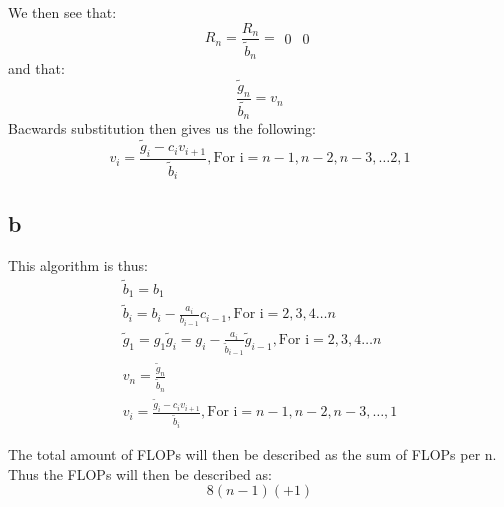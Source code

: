 \documentclass[english,notitlepage]{revtex4-1}  %
\begin{document}
        We then see that:
        \begin{equation*}
            R_n = \frac{R_n}{\tilde{b}_n} = 
            \begin{matrix}
            0 & 0 %
            \end{matrix}
        \end{equation*}
        and that:
        \begin{equation*}
            \frac{\tilde{g}_n}{\tilde{b_n}} = v_n
        \end{equation*}
            Bacwards substitution then gives us the following: 
        \begin{equation*}
            v_i = \frac{\tilde{g}_i - c_i v_{i+1}}{\tilde{b}_i}, \text{For i}  = n-1, n-2, n-3,  \dots 2, 1
        \end{equation*}
    \subsection*{b}
        \label{sec:6b}
        This algorithm is thus: 
        \begin{align*}
            \tilde{b}_1 
        =   b_1\\
            \tilde{b}_i 
        =   b_i - \frac{a_i}{b_{i-1}}c_{i-1}, \text{For i} = 2,3,4\dots n\\
            \tilde{g}_1 
        =   g_1
            \tilde{g}_i 
        =   g_i - \frac{a_i}{\tilde{b}_{i-1}}\tilde{g}_{i-1}, \text{For i} = 2, 3, 4 \dots n\\
            v_n 
        =   \frac{\tilde{g}_n}{\tilde{b}_n}\\
            v_i 
        =   \frac{\tilde{g}_i-c_i v_{i+1}}{\tilde{b}_i}, \text{For i} = n-1, n-2, n-3,\dots, 1 
        \end{align*}
        
        The total amount of FLOPs will then be described as the sum of FLOPs per n. Thus the FLOPs will then be described as: $$8(n-1)(+1)$$

        
\end{document}
